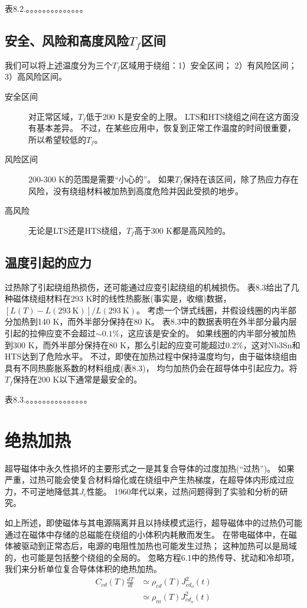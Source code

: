 表8.2.。。。。。。。。。。。。。。

\subsection{安全、风险和高度风险$T_f$区间}
我们可以将上述温度分为三个$T_f$区域用于绕组：1）安全区间； 2）有风险区间； 3）高风险区间。

\begin{description}
	\item[安全区间] 对正常区域，$T_f$低于200 K是安全的上限。
	LTS和HTS绕组之间在这方面没有基本差异。
	不过，在某些应用中，恢复到正常工作温度的时间很重要，所以希望较低的$T_f$。
	\item[风险区间] 200-300 K的范围是需要“小心的”。
	如果$T_f$保持在该区间，除了热应力存在风险，没有绕组材料被加热到高度危险并因此受损的地步。
	\item[高风险] 无论是LTS还是HTS绕组，$T_f$高于300 K都是高风险的。
\end{description}

\subsection{温度引起的应力}
过热除了引起绕组热损伤，还可能通过应变引起绕组的机械损伤。
表8.3给出了几种磁体绕组材料在293 K时的线性热膨胀(事实是，收缩)数据，$[L(T)-L(293\ \mathrm{K})]/L(293\ \mathrm{K})$。
考虑一个饼式线圈，并假设线圈的内半部分加热到140 K，而外半部分保持在80 K。
表8.3中的数据表明在外半部分最内层引起的拉伸应变不会超过$\sim 0.1\%$，这应该是安全的。
如果线圈的内半部分被加热到300 K，而外半部分保持在80 K，那么引起的应变可能超过$0.2\%$，这对Nb3Sn和HTS达到了危险水平。
不过，即使在加热过程中保持温度均匀，由于磁体绕组由具有不同热膨胀系数的材料组成(表8.3)，
均匀加热仍会在超导体中引起应力。将$T_f$保持在200 K以下通常是最安全的。

表8.3.。。。。。。。。。。。。。。。


\section{绝热加热}
超导磁体中永久性损坏的主要形式之一是其复合导体的过度加热(“过热”)。
如果严重，过热可能会使复合材料熔化或在绕组中产生热梯度，在超导体内形成过应力，不可逆地降低其$J_c$性能。
1960年代以来，过热问题得到了实验和分析的研究。

如上所述，即使磁体与其电源隔离并且以持续模式运行，超导磁体中的过热仍可能通过在磁体中存储的总磁能在绕组的小体积内耗散而发生。
在带电磁体中，在磁体被驱动到正常态后，电源的电阻性加热也可能发生过热；
这种加热可以是局域的，也可能是包括整个绕组的全局的。
忽略方程6.1中的热传导、扰动和冷却项，我们来分析单位复合导体体积的绝热加热。
\begin{subequations}
	\begin{align}
	C_{cd}(T)\frac{dT}{dt}&\simeq\rho_{cd}(T)J_{cd_o}^{2}(t) \\
	&\simeq\rho_m(T)J_{cd_o}^{2}(t)
	\end{align}
\end{subequations}

